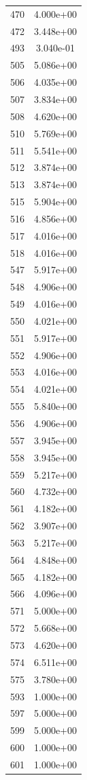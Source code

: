 \documentclass[12pt]{article}
\begin{document}
\begin{longtable}{@{}cc@{}}
470 & 4.000e+00 \\
472 & 3.448e+00 \\
493 & 3.040e-01 \\
505 & 5.086e+00 \\
506 & 4.035e+00 \\
507 & 3.834e+00 \\
508 & 4.620e+00 \\
510 & 5.769e+00 \\
511 & 5.541e+00 \\
512 & 3.874e+00 \\
513 & 3.874e+00 \\
515 & 5.904e+00 \\
516 & 4.856e+00 \\
517 & 4.016e+00 \\
518 & 4.016e+00 \\
547 & 5.917e+00 \\
548 & 4.906e+00 \\
549 & 4.016e+00 \\
550 & 4.021e+00 \\
551 & 5.917e+00 \\
552 & 4.906e+00 \\
553 & 4.016e+00 \\
554 & 4.021e+00 \\
555 & 5.840e+00 \\
556 & 4.906e+00 \\
557 & 3.945e+00 \\
558 & 3.945e+00 \\
559 & 5.217e+00 \\
560 & 4.732e+00 \\
561 & 4.182e+00 \\
562 & 3.907e+00 \\
563 & 5.217e+00 \\
564 & 4.848e+00 \\
565 & 4.182e+00 \\
566 & 4.096e+00 \\
571 & 5.000e+00 \\
572 & 5.668e+00 \\
573 & 4.620e+00 \\
574 & 6.511e+00 \\
575 & 3.780e+00 \\
593 & 1.000e+00 \\
597 & 5.000e+00 \\
599 & 5.000e+00 \\
600 & 1.000e+00 \\
601 & 1.000e+00 \\

\end{longtable}
\end{document}
